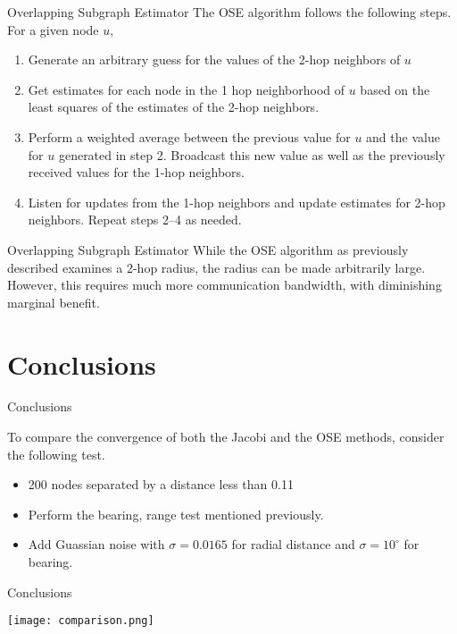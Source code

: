 \documentclass{beamer}
\begin{document}
\begin{frame}{Overlapping Subgraph Estimator}
The OSE algorithm follows the following steps. For a given node $u$, 
\begin{enumerate}
\item<1-> Generate an arbitrary guess for the values of the 2-hop neighbors of
$u$
\item<2-> Get estimates for each node in the 1 hop neighborhood of $u$ based on the least squares
of the estimates of the 2-hop neighbors. 
\item<3-> Perform a weighted average between the previous value for $u$ and the
value for $u$ generated in step 2. Broadcast this new value as well as the
previously received values for the 1-hop neighbors.
\item<4-> Listen for updates from the 1-hop neighbors and update estimates for
2-hop neighbors. Repeat steps 2--4 as needed.
\end{enumerate}
\end{frame}

\begin{frame}{Overlapping Subgraph Estimator}
While the OSE algorithm as previously described examines a 2-hop radius, the
radius can be made arbitrarily large. However, this requires much more
communication bandwidth, with diminishing marginal benefit.
\end{frame}

\section{Conclusions}
\begin{frame}{Conclusions}
\begin{center}
To compare the convergence of both the Jacobi and the OSE methods, consider the
following test.
\begin{itemize}
\item<1-> 200 nodes separated by a distance less than 0.11
\item<2-> Perform the bearing, range test mentioned previously.
\item<2-> Add Guassian noise with $\sigma = 0.0165$ for radial distance and
$\sigma = 10^{\circ}$ for bearing.
\end{itemize}
\end{center}
\end{frame}
\begin{frame}{Conclusions}
\begin{center}
\texttt{[image: comparison.png]}
\end{center}
\end{frame}
\end{document}
